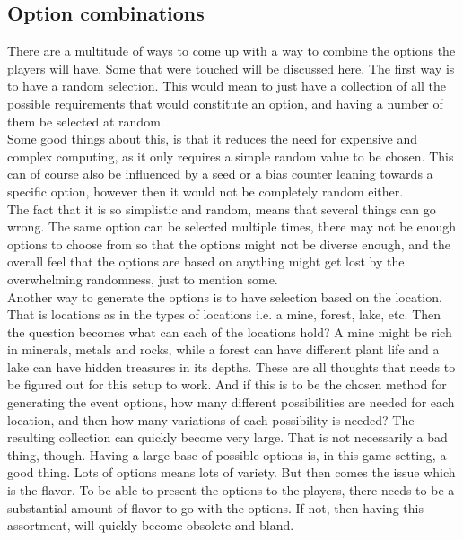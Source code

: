 \subsection{Option combinations}

There are a multitude of ways to come up with a way to combine the options the players will have. Some that were touched will be discussed here.
The first way is to have a random selection. This would mean to just have a collection of all the possible requirements that would constitute an option, and having a number of them be selected at random.\\
Some good things about this, is that it reduces the need for expensive and complex computing, as it only requires a simple random value to be chosen. This can of course also be influenced by a seed or a bias counter leaning towards a specific option, however then it would not be completely random either.\\
The fact that it is so simplistic and random, means that several things can go wrong. The same option can be selected multiple times, there may not be enough options to choose from so that the options might not be diverse enough, and the overall feel that the options are based on anything might get lost by the overwhelming randomness, just to mention some.\\

Another way to generate the options is to have selection based on the location. That is locations as in the types of locations i.e. a mine, forest, lake, etc. Then the question becomes what can each of the locations hold? A mine might be rich in minerals, metals and rocks, while a forest can have different plant life and a lake can have hidden treasures in its depths. These are all thoughts that needs to be figured out for this setup to work. And if this is to be the chosen method for generating the event options, how many different possibilities are needed for each location, and then how many variations of each possibility is needed? The resulting collection can quickly become very large. 
That is not necessarily a bad thing, though. Having a large base of possible options is, in this game setting, a good thing. Lots of options means lots of variety. But then comes the issue which is the flavor. To be able to present the options to the players, there needs to be a substantial amount of flavor to go with the options. If not, then having this assortment, will quickly become obsolete and bland.\\

